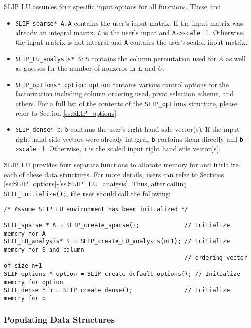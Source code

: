 \documentclass[12pt]{article}
\theoremstyle{definition}
\begin{document}
SLIP LU assumes four specific input options for all functions. These are:

\begin{itemize}
\item \verb|SLIP_sparse* A|: \verb|A| contains the user's input matrix. If the input matrix was already an integral matrix, \verb|A| is the user's input and \verb|A->scale|=1. Otherwise, the input matrix is not integral and \verb|A| contains the user's scaled input matrix.
\item \verb|SLIP_LU_analysis* S|: \verb|S| contains the column permutation used for $A$ as well as guesses for the number of nonzeros in $L$ and $U$.
\item \verb|SLIP_options* option|: \verb|option| contains various control options for the factorization including column ordering used, pivot selection scheme, and others. For a full list of the contents of the \verb|SLIP_options| structure, please refer to Section \ref{ss:SLIP_options}.
\item \verb|SLIP_dense* b|: \verb|b| contains the user's right hand side vector(s). If the input right hand side vectors were already integral, \verb|b| contains them directly and \verb|b->scale|=1. Otherwise, \verb|b| is the scaled input right hand side vector(s).
\end{itemize}

SLIP LU provides four separate functions to allocate memory for and initialize each of these data structures. For more details, users can refer to Sections \ref{ss:SLIP_options}-\ref{ss:SLIP_LU_analysis}. Thus, after calling \verb|SLIP_initialize();|, the user should call the following:

\begin{verbatim}
/* Assume SLIP LU environment has been initialized */

SLIP_sparse * A = SLIP_create_sparse();             // Initialize memory for A
SLIP_LU_analysis* S = SLIP_create_LU_analysis(n+1); // Initialize memory for S and column
                                                    // ordering vector of size n+1
SLIP_options * option = SLIP_create_default_options(); // Initialize memory for option
SLIP_dense * b = SLIP_create_dense();               // Initialize memory for b

\end{verbatim}

\subsubsection{Populating Data Structures}
\end{document}
